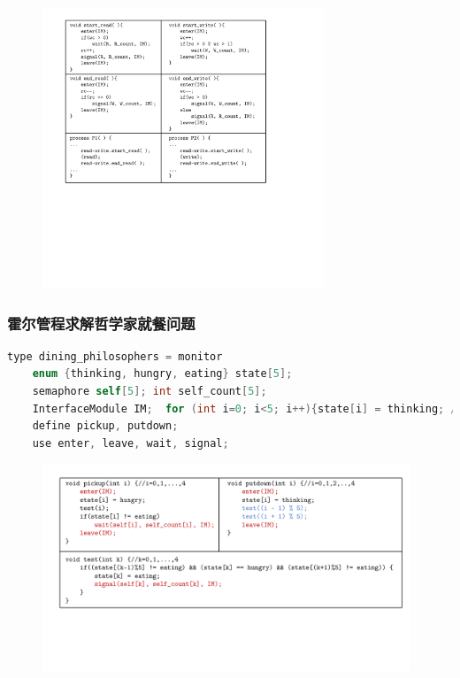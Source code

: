 \documentclass[cs4size,a4paper,10pt]{ctexart}
\begin{document}
	\begin{figure}[H]
		\centering
		\includegraphics[width=0.75\textwidth]{img/霍尔管程求解读者写者问题.pdf}
	\end{figure}

	\subsubsection{霍尔管程求解哲学家就餐问题}
	\begin{lstlisting}[language=C, keywordstyle=\color{black}]
type dining_philosophers = monitor
	enum {thinking, hungry, eating} state[5];
	semaphore self[5]; int self_count[5];
	InterfaceModule IM;  for (int i=0; i<5; i++){state[i] = thinking; //初始化，i为进程号}
	define pickup, putdown; 
	use enter, leave, wait, signal;
	\end{lstlisting}

	\begin{figure}[H]
		\centering
		\includegraphics[width=0.98\textwidth]{img/霍尔管程求解哲学家就餐问题.pdf}
	\end{figure}
\end{document}
